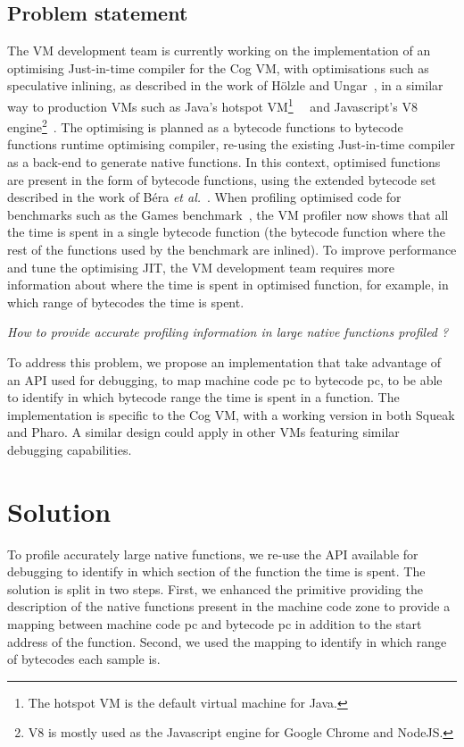 \documentclass[10pt,preprint]{sigplanconf}
\newcommand{\etal}{\emph{et al.}\xspace}
\begin{document}
\subsection{Problem statement}

The VM development team is currently working on the implementation of an optimising Just-in-time compiler for the Cog VM, with optimisations such as speculative inlining, as described in the work of H\"olzle and Ungar~\cite{Holz94a}, in a similar way to production VMs such as Java's hotspot VM\footnote{The hotspot VM is the default virtual machine for Java.}~~\cite{Pale01a} and Javascript's V8 engine\footnote{V8 is mostly used as the Javascript engine for Google Chrome and NodeJS.}~\cite{V8}. The optimising is planned as a bytecode functions to bytecode functions runtime optimising compiler, re-using the existing Just-in-time compiler as a back-end to generate native functions. In this context, optimised functions are present in the form of bytecode functions, using the extended bytecode set described in the work of B\'era \etal~\cite{Bera14a}. When profiling optimised code for benchmarks such as the Games benchmark~\cite{GameBenchs}, the VM profiler now shows that all the time is spent in a single bytecode function (the bytecode function where the rest of the functions used by the benchmark are inlined). To improve performance and tune the optimising JIT, the VM development team requires more information about where the time is spent in optimised function, for example, in which range of bytecodes the time is spent.

\emph{How to provide accurate profiling information in large native functions profiled ?}

To address this problem, we propose an implementation that take advantage of an API used for debugging, to map machine code pc to bytecode pc, to be able to identify in which bytecode range the time is spent in a function. The implementation is specific to the Cog VM, with a working version in both Squeak and Pharo. A similar design could apply in other VMs featuring similar debugging capabilities.


\section{Solution}

To profile accurately large native functions, we re-use the API available for debugging to identify in which section of the function the time is spent. The solution is split in two steps. First, we enhanced the primitive providing the description of the native functions present in the machine code zone to provide a mapping between machine code pc and bytecode pc in addition to the start address of the function. Second, we used the mapping to identify in which range of bytecodes each sample is.
\end{document}
